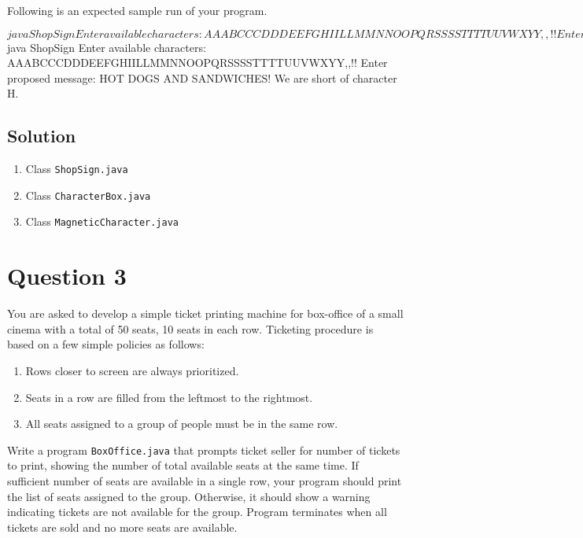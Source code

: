 \documentclass[12pt,letterpaper,twoside]{article}
\begin{document}
Following is an expected sample run of your program.

\begin{terminal}
$ java ShopSign
Enter available characters:
AAABCCCDDDEEFGHIILLMMNNOOPQRSSSSTTTTUUVWXYY,,!!
Enter proposed message: HOT DOGS AND BUNS!
The message makes it to the sign board.
$ java ShopSign
Enter available characters:
AAABCCCDDDEEFGHIILLMMNNOOPQRSSSSTTTTUUVWXYY,,!!
Enter proposed message: HOT DOGS AND SANDWICHES!
We are short of character H.
\end{terminal}

\subsection*{Solution}

\lstset{language=java}
\begin{enumerate}
	\item Class \texttt{ShopSign.java}
	
	\item Class \texttt{CharacterBox.java}
	
	\item Class \texttt{MagneticCharacter.java}
	
\end{enumerate}

\section*{Question 3}

You are asked to develop a simple ticket printing machine for box-office of a small cinema with a total of 50 seats, 10 seats in each row.
Ticketing procedure is based on a few simple policies as follows:

\begin{enumerate}[itemsep=0mm,rightmargin=\leftmargin]
  \item Rows closer to screen are always prioritized.
  \item Seats in a row are filled from the leftmost to the rightmost.
  \item All seats assigned to a group of people must be in the same row.
\end{enumerate}

Write a program \texttt{BoxOffice.java} that prompts ticket seller for number of tickets to print, showing the number of total available seats at the same time.
If sufficient number of seats are available in a single row, your program should print the list of seats assigned to the group.
Otherwise, it should show a warning indicating tickets are not available for the group.
Program terminates when all tickets are sold and no more seats are available.
\end{document}
